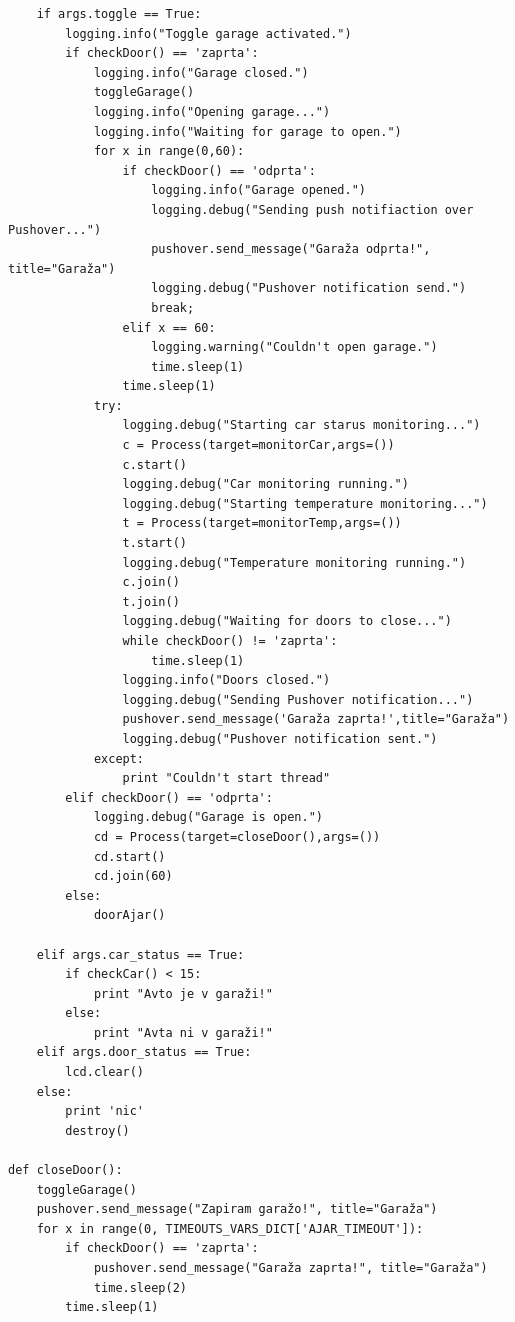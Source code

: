 \documentclass[11pt]{article}
\begin{document}
\begin{verbatim}
    if args.toggle == True:
        logging.info("Toggle garage activated.")
        if checkDoor() == 'zaprta':
            logging.info("Garage closed.")
            toggleGarage()
            logging.info("Opening garage...")
            logging.info("Waiting for garage to open.")
            for x in range(0,60):
                if checkDoor() == 'odprta':
                    logging.info("Garage opened.")
                    logging.debug("Sending push notifiaction over Pushover...")
                    pushover.send_message("Garaža odprta!", title="Garaža")
                    logging.debug("Pushover notification send.")
                    break;
                elif x == 60:
                    logging.warning("Couldn't open garage.")
                    time.sleep(1)
                time.sleep(1)
            try:
                logging.debug("Starting car starus monitoring...")
                c = Process(target=monitorCar,args=())
                c.start()
                logging.debug("Car monitoring running.")
                logging.debug("Starting temperature monitoring...")
                t = Process(target=monitorTemp,args=())
                t.start()
                logging.debug("Temperature monitoring running.")
                c.join()
                t.join()
                logging.debug("Waiting for doors to close...")
                while checkDoor() != 'zaprta':
                    time.sleep(1)
                logging.info("Doors closed.")
                logging.debug("Sending Pushover notification...")
                pushover.send_message('Garaža zaprta!',title="Garaža")
                logging.debug("Pushover notification sent.")
            except:
                print "Couldn't start thread"
        elif checkDoor() == 'odprta':
            logging.debug("Garage is open.")
            cd = Process(target=closeDoor(),args=())
            cd.start()
            cd.join(60)
        else:
            doorAjar()

    elif args.car_status == True:
        if checkCar() < 15:
            print "Avto je v garaži!"
        else:
            print "Avta ni v garaži!"
    elif args.door_status == True:
        lcd.clear()
    else:
        print 'nic'
        destroy()

def closeDoor():
    toggleGarage()
    pushover.send_message("Zapiram garažo!", title="Garaža")
    for x in range(0, TIMEOUTS_VARS_DICT['AJAR_TIMEOUT']):
        if checkDoor() == 'zaprta':
            pushover.send_message("Garaža zaprta!", title="Garaža")
            time.sleep(2)
        time.sleep(1)


\end{verbatim}
\end{document}
